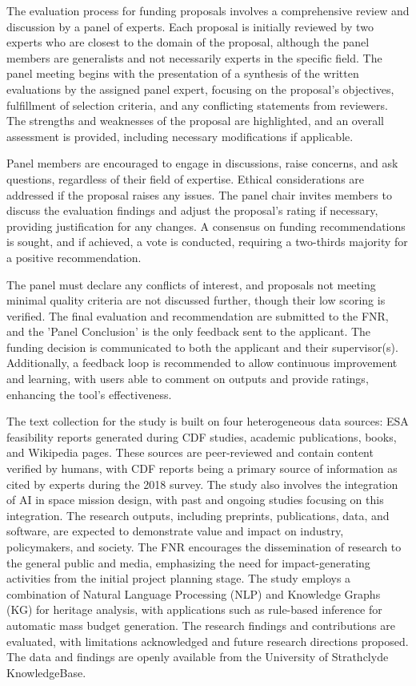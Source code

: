 \documentclass{article}
\begin{document}
The evaluation process for funding proposals involves a comprehensive review and discussion by a panel of experts. Each proposal is initially reviewed by two experts who are closest to the domain of the proposal, although the panel members are generalists and not necessarily experts in the specific field. The panel meeting begins with the presentation of a synthesis of the written evaluations by the assigned panel expert, focusing on the proposal's objectives, fulfillment of selection criteria, and any conflicting statements from reviewers. The strengths and weaknesses of the proposal are highlighted, and an overall assessment is provided, including necessary modifications if applicable.

Panel members are encouraged to engage in discussions, raise concerns, and ask questions, regardless of their field of expertise. Ethical considerations are addressed if the proposal raises any issues. The panel chair invites members to discuss the evaluation findings and adjust the proposal's rating if necessary, providing justification for any changes. A consensus on funding recommendations is sought, and if achieved, a vote is conducted, requiring a two-thirds majority for a positive recommendation.

The panel must declare any conflicts of interest, and proposals not meeting minimal quality criteria are not discussed further, though their low scoring is verified. The final evaluation and recommendation are submitted to the FNR, and the 'Panel Conclusion' is the only feedback sent to the applicant. The funding decision is communicated to both the applicant and their supervisor(s). Additionally, a feedback loop is recommended to allow continuous improvement and learning, with users able to comment on outputs and provide ratings, enhancing the tool's effectiveness.

The text collection for the study is built on four heterogeneous data sources: ESA feasibility reports generated during CDF studies, academic publications, books, and Wikipedia pages. These sources are peer-reviewed and contain content verified by humans, with CDF reports being a primary source of information as cited by experts during the 2018 survey. The study also involves the integration of AI in space mission design, with past and ongoing studies focusing on this integration. The research outputs, including preprints, publications, data, and software, are expected to demonstrate value and impact on industry, policymakers, and society. The FNR encourages the dissemination of research to the general public and media, emphasizing the need for impact-generating activities from the initial project planning stage. The study employs a combination of Natural Language Processing (NLP) and Knowledge Graphs (KG) for heritage analysis, with applications such as rule-based inference for automatic mass budget generation. The research findings and contributions are evaluated, with limitations acknowledged and future research directions proposed. The data and findings are openly available from the University of Strathclyde KnowledgeBase.
\end{document}
